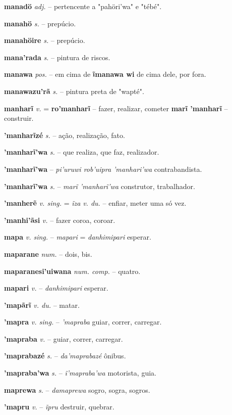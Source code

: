 \textbf{manadö} \textit{adj.} -- pertencente a "pahöri'wa" e "tébé".

\textbf{manahö} \textit{s.} -- prepúcio.

\textbf{manahöire} \textit{s.} -- prepúcio.

\textbf{mana'rada} \textit{s.} -- pintura de riscos.

\textbf{manawa} \textit{pos.} -- em cima de  \textbf{ĩmanawa wi} de cima dele, por fora.

\textbf{manawazu'rã} \textit{s.} -- pintura preta de "wapté".

\textbf{manharĩ} \textit{v.} = \textbf{ro'manharĩ} -- fazer, realizar, cometer  \textbf{marĩ 'manharĩ} -- construir.

\textbf{'manharĩzé} \textit{s.} -- ação, realização, fato.

\textbf{'manharĩ'wa} \textit{s.} -- que realiza, que faz, realizador.

\textbf{'manharĩ'wa} -- \textit{pi'uruwi rob'uipra 'manhari'wa} contrabandista.

\textbf{'manharĩ'wa} \textit{s.} -- \textit{marĩ 'manharĩ'wa} construtor, trabalhador.

\textbf{'manherẽ} \textit{v. sing.} = \textit{ĩza} \textit{v. du.} -- enfiar, meter uma só vez.

\textbf{'manhi'ãsi} \textit{v.} -- fazer coroa, coroar.

\textbf{mapa} \textit{v. sing.} -- \textit{mapari} = \textit{danhimipari} esperar.

\textbf{maparane} \textit{num.} -- dois, bis.

\textbf{maparanesi'uiwana} \textit{num. comp.} -- quatro.

\textbf{mapari} \textit{v.} -- \textit{danhimipari} esperar.

\textbf{'mapãrĩ} \textit{v. du.} -- matar.

\textbf{'mapra} \textit{v. sing.} -- \textit{'mapraba} guiar, correr, carregar.

\textbf{'mapraba} \textit{v.} -- guiar, correr, carregar.

\textbf{'maprabazé} \textit{s.} -- \textit{da'maprabazé} ônibus.

\textbf{'mapraba'wa} \textit{s.} -- \textit{ĩ'mapraba'wa} motorista, guia.

\textbf{maprewa} \textit{s.} -- \textit{damaprewa} sogro, sogra, sogros.

\textbf{'mapru} \textit{v.} -- \textit{ĩpru} destruir, quebrar.

